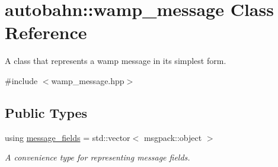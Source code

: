 \hypertarget{classautobahn_1_1wamp__message}{}\section{autobahn\+:\+:wamp\+\_\+message Class Reference}
\label{classautobahn_1_1wamp__message}


A class that represents a wamp message in its simplest form.  




{\ttfamily \#include $<$wamp\+\_\+message.\+hpp$>$}

\subsection*{Public Types}
\begin{DoxyCompactItemize}
\item 
using \hyperlink{classautobahn_1_1wamp__message_a2986ec144b289c128508c0e839d81147}{message\+\_\+fields} = std\+::vector$<$ msgpack\+::object $>$\hypertarget{classautobahn_1_1wamp__message_a2986ec144b289c128508c0e839d81147}{}\label{classautobahn_1_1wamp__message_a2986ec144b289c128508c0e839d81147}

\begin{DoxyCompactList}\small\item\em A convenience type for representing message fields. \end{DoxyCompactList}\end{DoxyCompactItemize}
